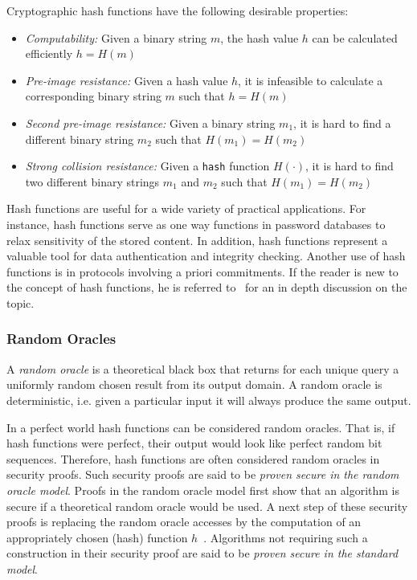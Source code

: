 Cryptographic hash functions have the following desirable properties:
\begin{itemize}
 \item \textit{Computability:} Given a binary string $m$, the hash value $h$ can be calculated efficiently $h = H \left( m \right)$
 \item \textit{Pre-image resistance:} Given a hash value $h$, it is infeasible to calculate a corresponding binary string $m$ such that $h = H \left( m \right)$
 \item \textit{Second pre-image resistance:} Given a binary string $m_1$, it is hard to find a different binary string $m_2$ such that $H \left( m_1 \right) = H \left( m_2 \right)$
 \item \textit{Strong collision resistance:} Given a \texttt{hash} function $H \left( \cdot \right)$, it is hard to find two different binary strings $m_1$ and $m_2$ such that $H \left( m_1 \right) = H \left( m_2 \right)$
\end{itemize}

Hash functions are useful for a wide variety of practical applications. For instance, hash functions serve as one way functions in password databases to relax sensitivity of the stored content. In addition, hash functions represent a valuable tool for data authentication and integrity checking. Another use of hash functions is in protocols involving a priori commitments. If the reader is new to the concept of hash functions, he is referred to~\cite{book:handbook_of_applied_cryptography} for an in depth discussion on the topic.

\subsubsection{Random Oracles}
A \textit{random oracle} is a theoretical black box that returns for each unique query a uniformly random chosen result from its output domain. A random oracle is deterministic, i.e. given a particular input it will always produce the same output.

In a perfect world hash functions can be considered random oracles. That is, if hash functions were perfect, their output would look like perfect random bit sequences. Therefore, hash functions are often considered random oracles in security proofs. Such security proofs are said to be \textit{proven secure in the random oracle model}. Proofs in the random oracle model first show that an algorithm is secure if a theoretical random oracle would be used. A next step of these security proofs is replacing the random oracle accesses by the computation of an appropriately chosen (hash) function $h$~\cite{art:BellareR93}. Algorithms not requiring such a construction in their security proof are said to be \textit{proven secure in the standard model}.

